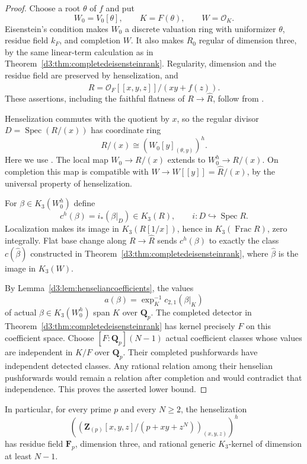 \documentclass[11pt,a4paper]{amsart}
\numberwithin{equation}{section}
\theoremstyle{definition}
\theoremstyle{remark}
\newcommand{\Q}{\mathbf Q}
\newcommand{\Z}{\mathbf Z}
\newcommand{\F}{\mathbf F}
\newcommand{\OO}{\mathcal O}
\newcommand{\Spec}{\operatorname{Spec}}
\newcommand{\Frac}{\operatorname{Frac}}
\begin{document}
\begin{proof}
Choose a root $\theta$ of $f$ and put
\[
W_0=V_0[\theta],\qquad K=F(\theta),\qquad W=\OO_K.
\]
Eisenstein's condition makes $W_0$ a discrete valuation ring with
uniformizer $\theta$, residue field $k_F$, and completion $W$.
It also makes $R_0$ regular of dimension three, by the same linear-term
calculation as in Theorem~\ref{d3:thm:completedeisensteinrank}.
Regularity, dimension and the residue field are preserved by
henselization, and
\[
\widehat R=\OO_F[[x,y,z]]/(xy+f(z)).
\]
These assertions, including the faithful flatness of $R\to\widehat R$,
follow from \cite[Section~15.46]{StacksHenselization}.

Henselization commutes with the quotient by $x$, so the regular divisor
$D=\Spec(R/(x))$ has coordinate ring
\[
R/(x)\cong \left(W_0[y]_{(\theta,y)}\right)^h.
\]
Here we use \cite[Section~10.156, Lemma~10.156.2]{StacksHenselization}.
The local map $W_0\to R/(x)$ extends to $W_0^h\to R/(x)$.
On completion this map is compatible with
$W\to W[[y]]=\widehat R/(x)$, by the universal property of
henselization.

For $\beta\in K_3(W_0^h)$ define
\[
c^h(\beta)=i_*(\beta|_D)\in K_3(R),
\qquad i:D\hookrightarrow\Spec R.
\]
Localization makes its image in $K_3(R[1/x])$, hence in
$K_3(\Frac R)$, zero integrally.  Flat base change along
$R\to\widehat R$ sends $c^h(\beta)$ to exactly the class $c(\widehat
\beta)$ constructed in Theorem~\ref{d3:thm:completedeisensteinrank},
where $\widehat\beta$ is the image in $K_3(W)$.

By Lemma~\ref{d3:lem:henseliancoefficients}, the values
\[
a(\beta)=\exp_K^{-1}c_{2,1}(\beta|_K)
\]
of actual $\beta\in K_3(W_0^h)$ span $K$ over $\Q_p$.
The completed detector in
Theorem~\ref{d3:thm:completedeisensteinrank} has kernel precisely $F$
on this coefficient space.  Choose $[F:\Q_p](N-1)$ actual coefficient
classes whose values are independent in $K/F$ over $\Q_p$.
Their completed pushforwards have independent detected classes.
Any rational relation among their henselian pushforwards would remain
a relation after completion and would contradict that independence.
This proves the asserted lower bound.
\end{proof}

In particular, for every prime $p$ and every $N\geq2$, the henselization
\[
\left(\left(\Z_{(p)}[x,y,z]/(p+xy+z^N)\right)_{(x,y,z)}\right)^h
\]
has residue field $\F_p$, dimension three, and rational generic
$K_3$-kernel of dimension at least $N-1$.
\end{document}
